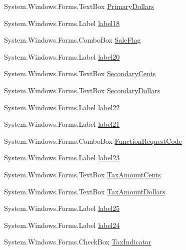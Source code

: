 \begin{DoxyCompactItemize}
System.\+Windows.\+Forms.\+Text\+Box \mbox{\hyperlink{class_form_sim_1_1_form1_ac00a03177b1af62159eada44d2a44699}{Primary\+Dollars}}
\item 
System.\+Windows.\+Forms.\+Label \mbox{\hyperlink{class_form_sim_1_1_form1_adb515d22e99686454c195a2f64089cbe}{label18}}
\item 
System.\+Windows.\+Forms.\+Combo\+Box \mbox{\hyperlink{class_form_sim_1_1_form1_ad7fea37dd402b41276b2fa9171d87bc0}{Sale\+Flag}}
\item 
System.\+Windows.\+Forms.\+Label \mbox{\hyperlink{class_form_sim_1_1_form1_afe5b5e36f7e56440452b586f0ea7dfef}{label20}}
\item 
System.\+Windows.\+Forms.\+Text\+Box \mbox{\hyperlink{class_form_sim_1_1_form1_a38d06c622545714c91406e7dfbe66d1c}{Secondary\+Cents}}
\item 
System.\+Windows.\+Forms.\+Text\+Box \mbox{\hyperlink{class_form_sim_1_1_form1_a70a61c269f99aa95af780899fabfcae4}{Secondary\+Dollars}}
\item 
System.\+Windows.\+Forms.\+Label \mbox{\hyperlink{class_form_sim_1_1_form1_a76b64b05b919b6f3ff44d4050e4f324a}{label22}}
\item 
System.\+Windows.\+Forms.\+Label \mbox{\hyperlink{class_form_sim_1_1_form1_a79b50aa0c2268985b96ebdc05ccd7a6a}{label21}}
\item 
System.\+Windows.\+Forms.\+Combo\+Box \mbox{\hyperlink{class_form_sim_1_1_form1_a46991f1bba83499f54cf854581c14784}{Function\+Request\+Code}}
\item 
System.\+Windows.\+Forms.\+Label \mbox{\hyperlink{class_form_sim_1_1_form1_af3fa36a6dc94765d3232e0e22153931f}{label23}}
\item 
System.\+Windows.\+Forms.\+Text\+Box \mbox{\hyperlink{class_form_sim_1_1_form1_adafe0ffc98595ab2668679d46d356c49}{Tax\+Amount\+Cents}}
\item 
System.\+Windows.\+Forms.\+Text\+Box \mbox{\hyperlink{class_form_sim_1_1_form1_aa1c8e908bdeca81bd6e86283ce1dd7c4}{Tax\+Amount\+Dollars}}
\item 
System.\+Windows.\+Forms.\+Label \mbox{\hyperlink{class_form_sim_1_1_form1_a3a5cccb776db1488c5446ac9b7c94934}{label25}}
\item 
System.\+Windows.\+Forms.\+Label \mbox{\hyperlink{class_form_sim_1_1_form1_a82d2fc3992cd81f21563dfcd7c6a00d0}{label24}}
\item 
System.\+Windows.\+Forms.\+Check\+Box \mbox{\hyperlink{class_form_sim_1_1_form1_a98599689cde2b5935abc183f6d88c994}{Tax\+Indicator}}
\item 

\end{DoxyCompactItemize}
